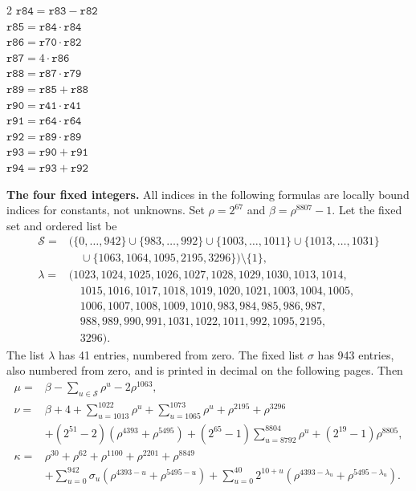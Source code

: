 \documentclass[10pt]{article}
\begin{document}
\begin{multicols}{2}
\(\mathtt{r84} = \mathtt{r83} - \mathtt{r82}\)\\
\(\mathtt{r85} = \mathtt{r84} \cdot \mathtt{r84}\)\\
\(\mathtt{r86} = \mathtt{r70} \cdot \mathtt{r82}\)\\
\(\mathtt{r87} = 4 \cdot \mathtt{r86}\)\\
\(\mathtt{r88} = \mathtt{r87} \cdot \mathtt{r79}\)\\
\(\mathtt{r89} = \mathtt{r85} + \mathtt{r88}\)\\
\(\mathtt{r90} = \mathtt{r41} \cdot \mathtt{r41}\)\\
\(\mathtt{r91} = \mathtt{r64} \cdot \mathtt{r64}\)\\
\(\mathtt{r92} = \mathtt{r89} \cdot \mathtt{r89}\)\\
\(\mathtt{r93} = \mathtt{r90} + \mathtt{r91}\)\\
\(\mathtt{r94} = \mathtt{r93} + \mathtt{r92}\)\\
\end{multicols}
\clearpage
\textbf{The four fixed integers.} All indices in the following formulas are
locally bound indices for constants, not unknowns. Set \(\rho=2^{67}\) and
\(\beta=\rho^{8807}-1\). Let the fixed set and ordered list be
\[
\begin{aligned}
\mathcal S={}&\bigl(\{0,\ldots,942\}\cup\{983,\ldots,992\}\cup
\{1003,\ldots,1011\}\cup\{1013,\ldots,1031\}\\
&\quad\cup\{1063,1064,1095,2195,3296\}\bigr)\setminus\{1\},\\
\lambda={}&(1023,1024,1025,1026,1027,1028,1029,1030,1013,1014,\\
&\quad 1015,1016,1017,1018,1019,1020,1021,1003,1004,1005,\\
&\quad 1006,1007,1008,1009,1010,983,984,985,986,987,\\
&\quad 988,989,990,991,1031,1022,1011,992,1095,2195,\\
&\quad 3296).
\end{aligned}
\]
The list \(\lambda\) has 41 entries, numbered from zero. The fixed list
\(\sigma\) has 943 entries, also numbered from zero, and is printed in
decimal on the following pages. Then
\[
\begin{aligned}
\mu={}&\beta-\sum_{u\in\mathcal S}\rho^u-2\rho^{1063},\\
\nu={}&\beta+4+\sum_{u=1013}^{1022}\rho^u+\sum_{u=1065}^{1073}\rho^u
 +\rho^{2195}+\rho^{3296}\\
&+(2^{51}-2)(\rho^{4393}+\rho^{5495})
 +(2^{65}-1)\sum_{u=8792}^{8804}\rho^u+(2^{19}-1)\rho^{8805},\\
\kappa={}&\rho^{30}+\rho^{62}+\rho^{1100}+\rho^{2201}+\rho^{8849}\\
&+\sum_{u=0}^{942}\sigma_u(\rho^{4393-u}+\rho^{5495-u})
 +\sum_{u=0}^{40}2^{10+u}(\rho^{4393-\lambda_u}+\rho^{5495-\lambda_u}).
\end{aligned}
\]
\end{document}
